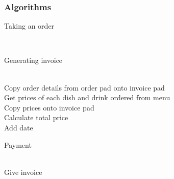 \begin{center}
\begin{tabular}{ | p{2cm} | p{3cm} | p{3cm} | p{2cm} |  }
    \hline
\end{tabular}
\label{tab:range_examples}
\end{center}

\newpage

\subsubsection{Algorithms}

\begin{algorithm}[H]
\label{fig:Order_from_customer}
    \caption{Taking an order}
\begin{algorithmic}[1]
\State
{}
    \Else \\
    \EndIf
\EndWhile
\end{algorithmic}
\end{algorithm}

\begin{algorithm}[H]
\label{fig:Generate_invoice}
    \caption{Generating invoice}
\begin{algorithmic}[1]
\State
{}
     \\
Copy order details from order pad onto invoice pad \\ 
Get prices of each dish and drink ordered from menu \\
Copy prices onto invoice pad \\
Calculate total price \\
Add date 
    \Else \\
    \EndIf
\EndWhile
\end{algorithmic}
\end{algorithm}

\begin{algorithm}[H]
\label{fig:Payment_from_customer}
    \caption{Payment}
\begin{algorithmic}[1]
\State
{}
     \\
	Give invoice
    \Else \\
    \EndIf
\EndWhile
\end{algorithmic}
\end{algorithm}

